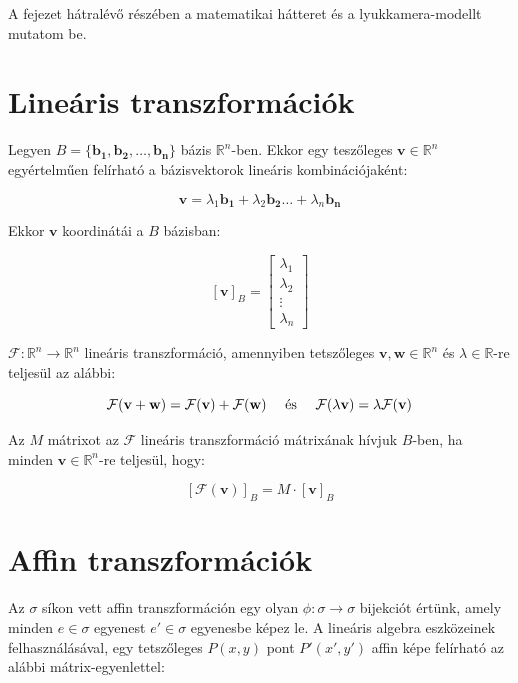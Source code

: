 A fejezet hátralévő részében a matematikai hátteret és a lyukkamera-modellt mutatom be.

\section{Lineáris transzformációk}

Legyen $B = \{\mathbf{b_1}, \mathbf{b_2}, \ldots, \mathbf{b_n}\}$ bázis $\mathbb{R}^n$-ben. Ekkor egy teszőleges $\mathbf{v} \in \mathbb{R}^n$ egyértelműen felírható a bázisvektorok lineáris kombinációjaként:

\[\mathbf{v} = \lambda_1\mathbf{b_1} + \lambda_2\mathbf{b_2} \ldots + \lambda_n\mathbf{b_n}\]

Ekkor $\mathbf{v}$ koordinátái a $B$ bázisban:

\[[\mathbf{v}]_B = \left[\begin{array}{c} \lambda_1\\ \lambda_2\\ \vdots\\ \lambda_n\end{array}\right]\]

$\mathcal{F}: \mathbb{R}^n \rightarrow \mathbb{R}^n$ lineáris transzformáció, amennyiben tetszőleges $\mathbf{v}, \mathbf{w} \in \mathbb{R}^n$ és $\lambda \in \mathbb{R}$-re teljesül az alábbi:

\[\mathcal{F}(\mathbf{v} + \mathbf{w}) = \mathcal{F}(\mathbf{v}) + \mathcal{F}(\mathbf{w}) \quad \hbox{ és } \quad \mathcal{F}(\lambda\mathbf{v}) = \lambda\mathcal{F}(\mathbf{v})\]

Az $M$ mátrixot az $\mathcal{F}$  lineáris transzformáció mátrixának hívjuk $B$-ben, ha minden $\mathbf{v}\in \mathbb{R}^n$-re teljesül, hogy:

\[[\mathcal{F}(\mathbf{v})]_B = M \cdot [\mathbf{v}]_B\]

\section{Affin transzformációk}

Az $\sigma$ síkon vett affin transzformáción egy olyan $\phi : \sigma \rightarrow \sigma$ bijekciót értünk, amely minden $e\in\sigma$ egyenest $e'\in\sigma$ egyenesbe képez le. A lineáris algebra eszközeinek felhasználásával, egy tetszőleges $P(x, y)$ pont $P'(x', y')$ affin képe felírható az alábbi mátrix-egyenlettel:

